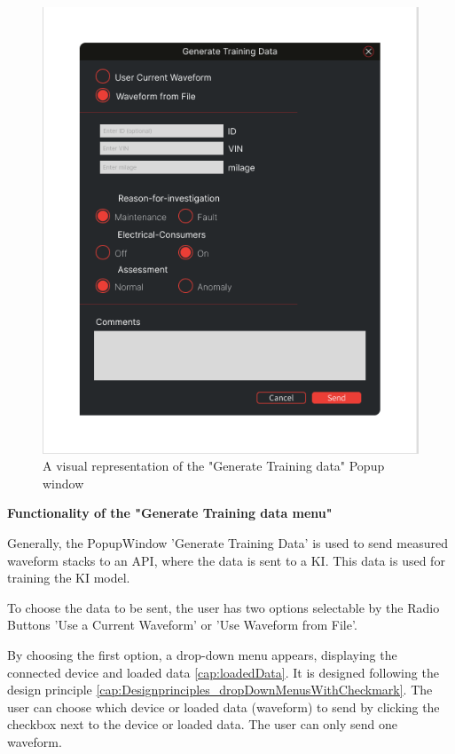 \documentclass[]{scrreprt}
\begin{document}
\begin{figure}
    \includegraphics[width=.9\textwidth]{assets/pictures/GenerateTrainingDataMenu.png}
    \caption[]{A visual representation of the "Generate Training data" Popup window}
    \label{fig: Generate Training data Popupwindow}
\end{figure}

\textbf{Functionality of the "Generate Training data menu"}

Generally, the PopupWindow 'Generate Training Data' is used to send measured waveform stacks to an API, where the data is sent to a KI. This data is used for training the KI model.

To choose the data to be sent, the user has two options selectable by the Radio Buttons 'Use a Current Waveform' or 'Use Waveform from File'.

By choosing the first option, a drop-down menu appears, displaying the connected device and loaded data \ref{cap:loadedData}. It is designed following the design principle \ref{cap:Designprinciples_dropDownMenusWithCheckmark}. 
The user can choose which device or loaded data (waveform) to send by clicking the checkbox next to the device or loaded data. The user can only send one waveform.
\end{document}

